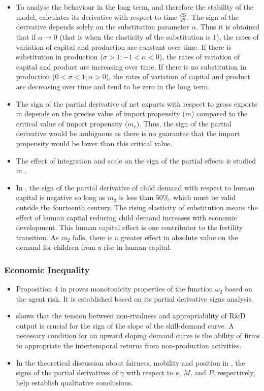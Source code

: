 \documentclass[11pt]{book}
\begin{document}
\begin{itemize}
\item To analyse the behaviour in the long term, and therefore the stability
of the model, \cite{perez2019economic}
calculates its derivative with respect to time $\frac{dG}{dt}$. The
sign of the derivative depends solely on the substitution parameter
$\alpha$. Thus it is obtained that if $\alpha\rightarrow0$ (that
is when the elasticity of the substitution is $1$), the rates of
variation of capital and production are constant over time. If there
is substitution in production ($\sigma>1;-1<\alpha<0$), the rates
of variation of capital and product are increasing over time. If there
is no substitution in production ($0<\sigma<1;\alpha>0$), the rates
of variation of capital and product are decreasing over time and tend
to be zero in the long term.
\item The sign of the partial derivative of net exports with respect to
gross exports in \cite{dasgupta2020explains}
depends on the precise value of import propensity ($m$) compared
to the critical value of import propensity ($m_{c}$). Thus, the sign
of the partial derivative would be ambiguous as there is no guarantee
that the import propensity would be lower than this critical value.
\item The effect of integration and scale on the sign of the partial effects
is studied in \cite{ott2021institutional}.
\item In \cite{foreman2021fertility},
the sign of the partial derivative of child demand with respect to
human capital is negative so long as $m_{2}$ is less than $50\%$,
which must be valid outside the fourteenth century. The rising elasticity
of substitution means the effect of human capital reducing child demand
increases with economic development. This human capital effect is
one contributor to the fertility transition. As $m_{2}$ falls, there
is a greater effect in absolute value on the demand for children from
a rise in human capital.
\end{itemize}
\subsubsection{Economic Inequality}
\begin{itemize}
\item Proposition 4 in \cite{cato2014inequality}
proves monotonicity properties of the function $\omega_{2}$ based
on the agent risk. It is established based on its partial derivative
signs analysis.
\item \cite{nahuis2000rising}
shows that the tension between non-rivalness and appropriability of
R\&D output is crucial for the sign of the slope of the skill-demand
curve. A necessary condition for an upward sloping demand curve is
the ability of firms to appropriate the intertemporal returns from
non-production activities.
\item In the theoretical discussion about fairness, mobility and position
in \cite{bergolo2019we}, the signs of the partial
derivatives of $\gamma$ with respect to $e$, $M$, and $P$, respectively,
help establish qualitative conclusions.
\end{itemize}
\end{document}
